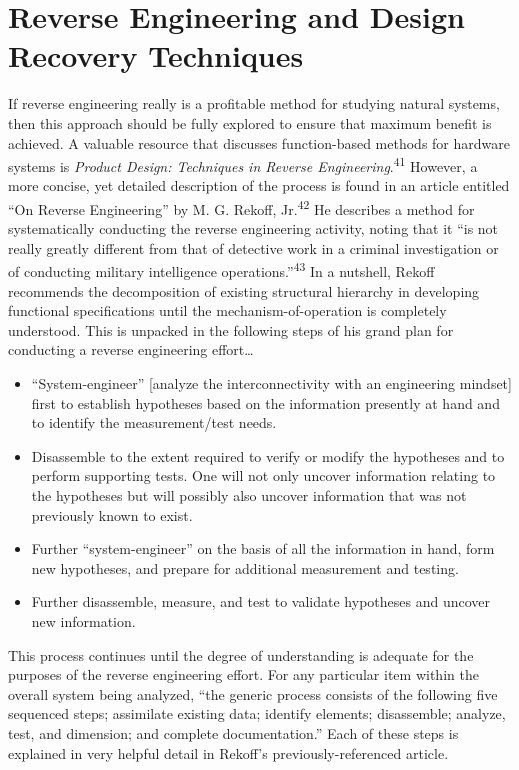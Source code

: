 \section{Reverse Engineering and Design Recovery Techniques}

If reverse engineering really is a profitable method for studying
natural systems, then this approach should be fully explored to ensure
that maximum benefit is achieved. A valuable resource that discusses
function-based methods for hardware systems is \textit{Product Design:
Techniques in Reverse Engineering}.\textsuperscript{41} However, a more
concise, yet detailed description of the process is found in an article
entitled “On Reverse Engineering” by M. G. Rekoff,
Jr.\textsuperscript{42} He describes a method for systematically
conducting the reverse engineering activity, noting that it “is not
really greatly different from that of detective work in a criminal
investigation or of conducting military intelligence
operations.”\textsuperscript{43} In a nutshell, Rekoff recommends the
decomposition of existing structural hierarchy in developing functional
specifications until the mechanism-of-operation is completely
understood. This is unpacked in the following steps of his grand plan
for conducting a reverse engineering effort…

\begin{itemize}
\item 
“System-engineer” [analyze the interconnectivity with an engineering
mindset] first to establish hypotheses based on the information
presently at hand and to identify the measurement/test needs.
\item 
Disassemble to the extent required to verify or modify the hypotheses
and to perform supporting tests. One will not only uncover information
relating to the hypotheses but will possibly also uncover information
that was not previously known to exist.
\item 
Further “system-engineer” on the basis of all the information in hand,
form new hypotheses, and prepare for additional measurement and
testing.
\item 
Further disassemble, measure, and test to validate hypotheses and
uncover new information.
\end{itemize}

This process continues until the degree of understanding is adequate for
the purposes of the reverse engineering effort. For any particular item
within the overall system being analyzed, “the generic process consists
of the following five sequenced steps; assimilate existing data;
identify elements; disassemble; analyze, test, and dimension; and
complete documentation.” Each of these steps is explained in very
helpful detail in Rekoff’s previously-referenced article.


